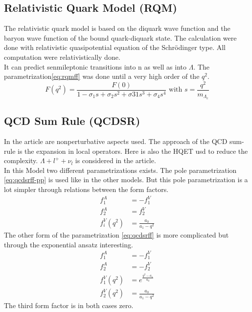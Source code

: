 \subsection{Relativistic Quark Model (RQM)}
The relativistic quark model{\cite{RQM}} is based on the diquark wave function 
and the baryon wave function of the bound quark-diquark state. The calculation 
were done with relativistic quasipotential equation of the Schr\"{o}dinger type.
All computation were relativistically done.\\
It can predict senmileptonic transitions into n as well as into \(\Lambda\).
The parametrization{\eqref{eq:rqmff}} was done until a very high order of the 
\(q^2\).
\begin{equation}
  F(q^2) = \frac{F(0)}{1 - \sigma_1 s + \sigma_2 s^2 + \sigma31 s^3 + \sigma_4 s^4} 
  \text{ with } s = \frac{q^2}{m_{\Lambda_c}} \label{eq:rqmff}
\end{equation}

\subsection{QCD Sum Rule (QCDSR)}
In the article {\cite{QCDSR}} are nonperturbative aspects used. The approach of 
the QCD sum-rule is the expansion in local operators. Here is also the HQET usd 
to reduce the complexity. \(\Lambda + l^+ + \nu_l\) is considered in the article.\\
In this Model two different parametrizations exists. The pole parametrization 
{\eqref{eq:qcdsrff-pp}} is used like in the other models. But this pole 
parametrization is a lot simpler through relations between the form factors.
\begin{align}
  f^A_1 & = - f^V_1 \nonumber \\
  f^A_2 & = f^V_2 \nonumber \\
  f^V_i(q^2) & = \frac{a_0}{a_1 - q^2} \label{eq:qcdsrff-pp}
\end{align} 
The other form of the parametrization  {\eqref{eq:qcdsrff}} is more complicated 
but through the exponential ansatz interesting.
\begin{align}
  f^A_1 & = - f^V_1 \nonumber \\
  f^A_2 & = - f^V_2 \nonumber \\
  f^V_1(q^2) & = e^{\frac{q^2 - a_1}{a_0}} \nonumber \\
  f^V_2(q^2) & = \frac{a_0}{a_1 - q^2} \label{eq:qcdsrff}
\end{align} 
The third form factor is in both cases zero.

